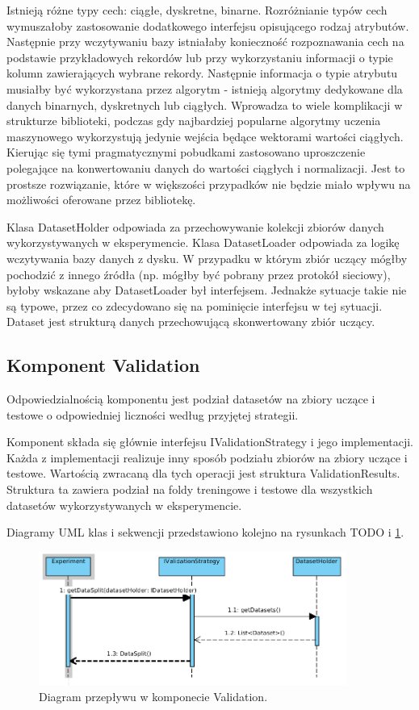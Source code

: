 \documentclass[12pt]{article}
\begin{document}
Istnieją różne typy cech: ciągłe, dyskretne, binarne. Rozróżnianie typów cech wymuszałoby zastosowanie dodatkowego interfejsu opisującego rodzaj atrybutów. Następnie przy wczytywaniu bazy istniałaby konieczność rozpoznawania cech na podstawie przykładowych rekordów lub przy wykorzystaniu informacji o typie kolumn zawierających wybrane rekordy. Następnie informacja o typie atrybutu musiałby być wykorzystana przez algorytm - istnieją algorytmy dedykowane dla danych binarnych, dyskretnych lub ciągłych. Wprowadza to wiele komplikacji w strukturze biblioteki, podczas gdy najbardziej popularne algorytmy uczenia maszynowego wykorzystują jedynie wejścia będące wektorami wartości ciągłych. Kierując się tymi pragmatycznymi pobudkami zastosowano uproszczenie polegające na konwertowaniu danych do wartości ciągłych i normalizacji. Jest to prostsze rozwiązanie, które w większości przypadków nie będzie miało wpływu na możliwości oferowane przez bibliotekę.

Klasa DatasetHolder odpowiada za przechowywanie kolekcji zbiorów danych wykorzystywanych w eksperymencie. Klasa DatasetLoader odpowiada za logikę wczytywania bazy danych z dysku. W przypadku w którym zbiór uczący mógłby pochodzić z innego źródła (np. mógłby być pobrany przez protokół sieciowy), byłoby wskazane aby DatasetLoader był interfejsem. Jednakże sytuacje takie nie są typowe, przez co zdecydowano się na pominięcie interfejsu w tej sytuacji. Dataset jest strukturą danych przechowującą skonwertowany zbiór uczący.

\subsection{Komponent Validation}

Odpowiedzialnością komponentu jest podział datasetów na zbiory uczące i testowe o odpowiedniej liczności według przyjętej strategii.

Komponent składa się głównie interfejsu IValidationStrategy i jego implementacji. Każda z implementacji realizuje inny sposób podziału zbiorów na zbiory uczące i testowe. Wartością zwracaną dla tych operacji jest struktura ValidationResults. Struktura ta zawiera podział na foldy treningowe i testowe dla wszystkich datasetów wykorzystywanych w eksperymencie. 

Diagramy UML klas i sekwencji przedstawiono kolejno na rysunkach TODO i \ref{fig:sequenceValidation}.

\begin{figure}
	\centering
	\includegraphics[width=0.9\textwidth]{img/sequenceValidation.png}
	\caption{Diagram przepływu w komponecie Validation.}
	\label{fig:sequenceValidation}
\end{figure}
\end{document}
